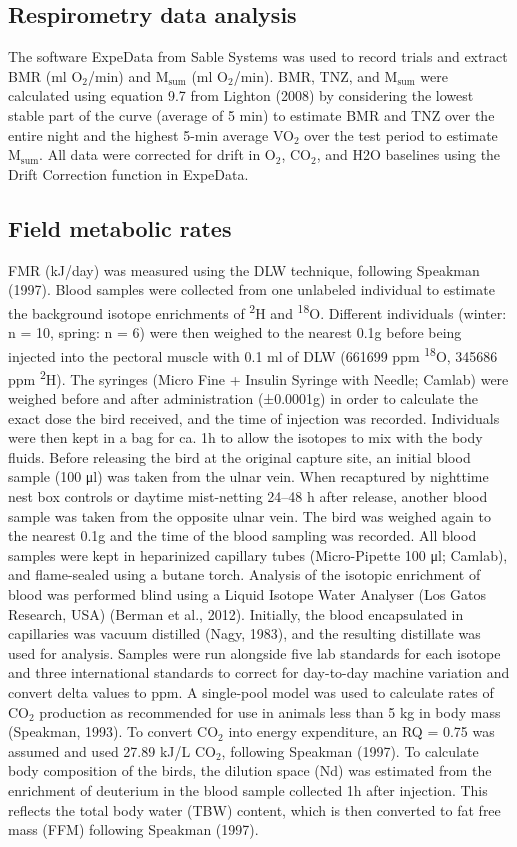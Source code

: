 \documentclass[10pt, twoside]{book} %
\begin{document}
\subsection{Respirometry data analysis}
The software ExpeData from Sable Systems was used to record trials and extract BMR (ml O$_{\text{2}}$/min) and M$_{\text{sum}}$ (ml O$_{\text{2}}$/min). BMR, TNZ, and M$_{\text{sum}}$ were calculated using equation 9.7 from Lighton (2008) by considering the lowest stable part of the curve (average of 5 min) to estimate BMR and TNZ over the entire night and the highest 5-min average VO$_{\text{2}}$ over the test period to estimate M$_{\text{sum}}$. All data were corrected for drift in O$_{\text{2}}$, CO$_{\text{2}}$, and H2O baselines using the Drift Correction function in ExpeData.
\subsection{Field metabolic rates}
FMR (kJ/day) was measured using the DLW technique, following Speakman (1997). Blood samples were collected from one unlabeled individual to estimate the background isotope enrichments of \textsuperscript{2}H and \textsuperscript{18}O. Different individuals (winter: n = 10, spring: n = 6) were then weighed to the nearest 0.1g before being injected into the pectoral muscle with 0.1 ml of DLW (661699 ppm \textsuperscript{18}O, 345686 ppm \textsuperscript{2}H). The syringes (Micro Fine + Insulin Syringe with Needle; Camlab) were weighed before and after administration (±0.0001g) in order to calculate the exact dose the bird received, and the time of injection was recorded. Individuals were then kept in a bag for ca. 1h to allow the isotopes to mix with the body fluids. Before releasing the bird at the original capture site, an initial blood sample (100 μl) was taken from the ulnar vein. When recaptured by nighttime nest box controls or daytime mist-netting 24–48 h after release, another blood sample was taken from the opposite ulnar vein. The bird was weighed again to the nearest 0.1g and the time of the blood sampling was recorded. All blood samples were kept in heparinized capillary tubes (Micro-Pipette 100 μl; Camlab), and flame-sealed using a butane torch. Analysis of the isotopic enrichment of blood was performed blind using a Liquid Isotope Water Analyser (Los Gatos Research, USA) (Berman et al., 2012). Initially, the blood encapsulated in capillaries was vacuum distilled (Nagy, 1983), and the resulting distillate was used for analysis. Samples were run alongside five lab standards for each isotope and three international standards to correct for day-to-day machine variation and convert delta values to ppm. A single-pool model was used to calculate rates of CO$_{\text{2}}$ production as recommended for use in animals less than 5 kg in body mass (Speakman, 1993). To convert CO$_{\text{2}}$ into energy expenditure, an RQ = 0.75 was assumed and used 27.89 kJ/L CO$_{\text{2}}$, following Speakman (1997). To calculate body composition of the birds, the dilution space (Nd) was estimated from the enrichment of deuterium in the blood sample collected 1h after injection. This reflects the total body water (TBW) content, which is then converted to fat free mass (FFM) following Speakman (1997).
\end{document}
